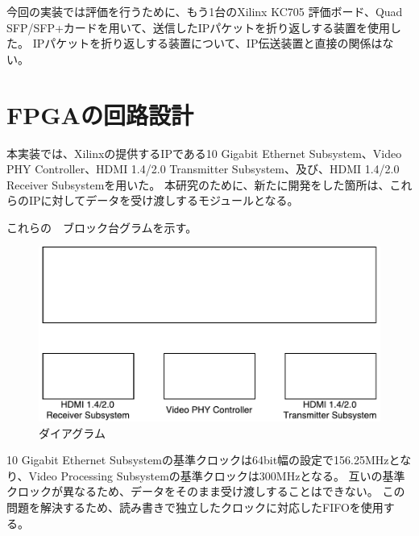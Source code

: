 今回の実装では評価を行うために、もう1台のXilinx KC705 評価ボード、Quad SFP/SFP+カードを用いて、送信したIPパケットを折り返しする装置を使用した。
IPパケットを折り返しする装置について、IP伝送装置と直接の関係はない。

\section{FPGAの回路設計}

本実装では、Xilinxの提供するIPである10 Gigabit Ethernet Subsystem\cite{xilinx-pg157}、Video PHY Controller\cite{xilinx-pg230}、HDMI 1.4/2.0 Transmitter Subsystem\cite{xilinx-pg235}、及び、HDMI 1.4/2.0 Receiver Subsystem\cite{xilinx-pg236}を用いた。
本研究のために、新たに開発をした箇所は、これらのIPに対してデータを受け渡しするモジュールとなる。

これらの　ブロック台グラムを示す。
\begin{figure}[htbp]
  \begin{center}
    \includegraphics[bb=0 0 452 229,width=15.5cm]{img/fpga-whole-diagram.pdf}
  \end{center}
  \caption{ダイアグラム}
  \label{fig:fpga-whole-diagram}
\end{figure}

10 Gigabit Ethernet Subsystemの基準クロックは64bit幅の設定で156.25MHzとなり、Video Processing Subsystemの基準クロックは300MHzとなる。
互いの基準クロックが異なるため、データをそのまま受け渡しすることはできない。
この問題を解決するため、読み書きで独立したクロックに対応したFIFOを使用する。

